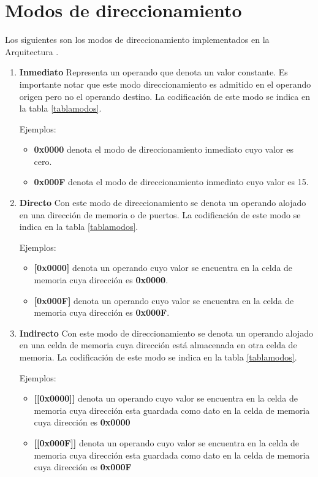 \section{Modos de direccionamiento}
Los siguientes son los modos de direccionamiento implementados en la Arquitectura \Q.
\begin{enumerate}

\item \textbf{Inmediato} Representa un operando que denota un valor constante. Es importante notar que este modo direccionamiento es admitido en el operando origen pero no el operando destino. La codificación de este modo se indica en la tabla \ref{tablamodos}.

Ejemplos:
\begin{itemize}
\item \textbf{0x0000} denota el modo de direccionamiento inmediato cuyo valor es cero.
\item \textbf{0x000F} denota el modo de direccionamiento inmediato cuyo valor es 15.
\end{itemize}


\item \textbf{Directo}
Con este modo de direccionamiento se denota un operando alojado en una dirección de memoria o de puertos. La codificación de este modo se indica en la tabla \ref{tablamodos}.

Ejemplos:
\begin{itemize}
\item \textbf{[0x0000]} denota un operando cuyo valor se encuentra en la celda de memoria cuya dirección es \textbf{0x0000}.
\item \textbf{[0x000F]} denota  un operando cuyo valor se encuentra en la celda de memoria cuya dirección es \textbf{0x000F}.
\end{itemize}


\item \textbf{Indirecto}
Con este modo de direccionamiento se denota un operando alojado en una celda de memoria cuya dirección está almacenada en otra celda de memoria. La codificación de este modo se indica en la tabla \ref{tablamodos}.

Ejemplos:
\begin{itemize}
\item \textbf{[[0x0000]]} denota un operando cuyo valor se encuentra en la celda de memoria cuya dirección esta guardada como dato en la celda de memoria cuya dirección es \textbf{0x0000}
\item \textbf{[[0x000F]]} denota un operando cuyo valor se encuentra en la celda de memoria cuya dirección esta guardada como dato en la celda de memoria cuya dirección es \textbf{0x000F}
\end{itemize}


\end{enumerate}

